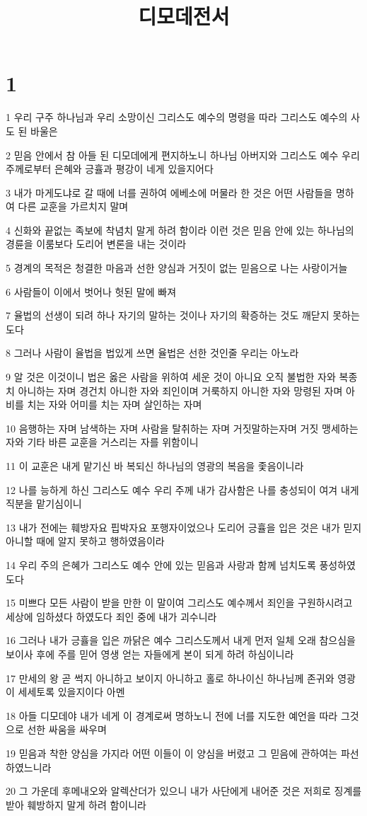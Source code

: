 

\title{디모데전서}


\chapter{1}

\par 1 우리 구주 하나님과 우리 소망이신 그리스도 예수의 명령을 따라 그리스도 예수의 사도 된 바울은
\par 2 믿음 안에서 참 아들 된 디모데에게 편지하노니 하나님 아버지와 그리스도 예수 우리 주께로부터 은혜와 긍휼과 평강이 네게 있을지어다
\par 3 내가 마게도냐로 갈 때에 너를 권하여 에베소에 머물라 한 것은 어떤 사람들을 명하여 다른 교훈을 가르치지 말며
\par 4 신화와 끝없는 족보에 착념치 말게 하려 함이라 이런 것은 믿음 안에 있는 하나님의 경륜을 이룸보다 도리어 변론을 내는 것이라
\par 5 경계의 목적은 청결한 마음과 선한 양심과 거짓이 없는 믿음으로 나는 사랑이거늘
\par 6 사람들이 이에서 벗어나 헛된 말에 빠져
\par 7 율법의 선생이 되려 하나 자기의 말하는 것이나 자기의 확증하는 것도 깨닫지 못하는도다
\par 8 그러나 사람이 율법을 법있게 쓰면 율법은 선한 것인줄 우리는 아노라
\par 9 알 것은 이것이니 법은 옳은 사람을 위하여 세운 것이 아니요 오직 불법한 자와 복종치 아니하는 자며 경건치 아니한 자와 죄인이며 거룩하지 아니한 자와 망령된 자며 아비를 치는 자와 어미를 치는 자며 살인하는 자며
\par 10 음행하는 자며 남색하는 자며 사람을 탈취하는 자며 거짓말하는자며 거짓 맹세하는 자와 기타 바른 교훈을 거스리는 자를 위함이니
\par 11 이 교훈은 내게 맡기신 바 복되신 하나님의 영광의 복음을 좇음이니라
\par 12 나를 능하게 하신 그리스도 예수 우리 주께 내가 감사함은 나를 충성되이 여겨 내게 직분을 맡기심이니
\par 13 내가 전에는 훼방자요 핍박자요 포행자이었으나 도리어 긍휼을 입은 것은 내가 믿지 아니할 때에 알지 못하고 행하였음이라
\par 14 우리 주의 은혜가 그리스도 예수 안에 있는 믿음과 사랑과 함께 넘치도록 풍성하였도다
\par 15 미쁘다 모든 사람이 받을 만한 이 말이여 그리스도 예수께서 죄인을 구원하시려고 세상에 임하셨다 하였도다 죄인 중에 내가 괴수니라
\par 16 그러나 내가 긍휼을 입은 까닭은 예수 그리스도께서 내게 먼저 일체 오래 참으심을 보이사 후에 주를 믿어 영생 얻는 자들에게 본이 되게 하려 하심이니라
\par 17 만세의 왕 곧 썩지 아니하고 보이지 아니하고 홀로 하나이신 하나님께 존귀와 영광이 세세토록 있을지이다 아멘
\par 18 아들 디모데야 내가 네게 이 경계로써 명하노니 전에 너를 지도한 예언을 따라 그것으로 선한 싸움을 싸우며
\par 19 믿음과 착한 양심을 가지라 어떤 이들이 이 양심을 버렸고 그 믿음에 관하여는 파선하였느니라
\par 20 그 가운데 후메내오와 알렉산더가 있으니 내가 사단에게 내어준 것은 저희로 징계를 받아 훼방하지 말게 하려 함이니라

